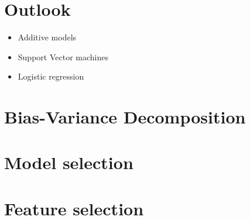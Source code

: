 \documentclass[12pt,a4paper]{article}
\begin{document}
\section{Outlook}
\begin{itemize} \itemsep0em
	\item Additive models
	\item Support Vector machines
	\item Logistic regression
\end{itemize}
\section{Bias-Variance Decomposition}
\section{Model selection}
\section{Feature selection}



\end{document}
